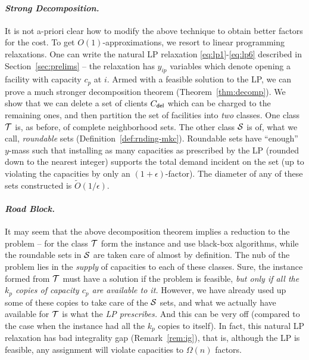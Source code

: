 \paragraph{\emph{Strong Decomposition.}}
It is not a-priori clear how to modify the above technique to obtain better factors for the cost. To get $O(1)$-approximations, we resort to linear programming relaxations. One can write the natural LP relaxation \eqref{eq:lp1}-\eqref{eq:lp6} described in Section~\ref{sec:prelims} -- the relaxation has $y_{ip}$ variables which denote opening a
facility with capacity $c_p$ at $i$.
Armed with a feasible solution to the LP, we can prove a much stronger decomposition theorem (Theorem~\ref{thm:decomp}). We show that we can delete a set of clients $C_{\mathsf{del}}$ which can be charged to the remaining ones, and then partition the set of facilities into {\em two} classes.
One class ${\cal T}$  is, as before, of complete neighborhood sets. The other class ${\cal S}$  is of, what we call, {\em roundable} sets (Definition~\ref{def:rnding-mkc}). Roundable sets have ``enough'' $y$-mass such that installing as many  capacities as prescribed by the LP (rounded down to the nearest integer) supports the total demand incident on the set (up to violating the capacities by only an $(1+\epsilon)$-factor). The diameter of any of these sets constructed is $\tilde{O}(1/\epsilon)$.

\paragraph{\emph{Road Block.}}
It may seem that the above decomposition theorem implies a reduction to the \cckp problem -- for the class ${\cal T}$ form the \cckp instance and use black-box algorithms, while the roundable sets in ${\cal S}$ are taken care of almost by definition.
The nub of the problem lies in the {\em supply} of capacities to each of these classes.  Sure, the \cckp instance formed from ${\cal T}$ must have a solution if the \mckc problem is feasible, {\em but only if all the $k_p$ copies of capacity $c_p$ are available to it.} However, we have already used up some of these copies to take care of the ${\cal S}$ sets, and what we actually have available for ${\cal T}$ is what the {\em LP prescribes.} And this can be very off (compared to the case when the \cckp instance had all the $k_p$ copies to itself). In fact, this natural  LP relaxation has bad integrality gap (Remark~\ref{rem:ig}), that is, although the LP is feasible, any assignment will violate capacities to $\Omega(n)$ factors.%

